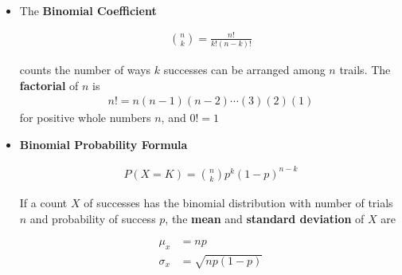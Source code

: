 \documentclass[Main.tex]{subfiles}
\begin{document}
	\begin{example} \hfill \\
		\begin{itemize}	
			\item The \textbf{Binomial Coefficient}\hfill
			\begin{definition}\hfill
				\begin{subequations}
					\begin{align}
						\binom{n}{k} =\frac{n!}{k!(n-k)!}
					\end{align}
				\end{subequations}\hfill	
			\end{definition}
			counts the number of ways $k$ successes can be arranged among $n$ trails. The \textbf{factorial} of $n$ is\hfill
			\begin{subequations}
				\begin{align}
					n!=n(n-1)(n-2)\cdots (3)(2)(1)
				\end{align}
			\end{subequations}	
			for positive whole numbers $n$, and $0!=1$\hfill \\
			\item \textbf{Binomial Probability Formula}
			\begin{definition}\hfill
				\begin{subequations}
					\begin{align}
						P(X=K)=\binom{n}{k}p^{k}(1-p)^{n-k}
					\end{align}
				\end{subequations}\hfill	
			\end{definition}
			If a count $X$ of successes has the binomial distribution with number of trials $n$ and probability of success $p$, the \textbf{mean} and \textbf{standard deviation} of $X$ are	
			\begin{definition}\index{[Mean and Standard deviation of Binomial distribution}\hfill
				\begin{subequations}
					\begin{align}
						\mu_{x}&=np\\
						\sigma_{x}&=\sqrt{np(1-p)}
					\end{align}
				\end{subequations}\hfill	
			\end{definition}												
		\end{itemize}
	\end{example}
	
\end{document}

